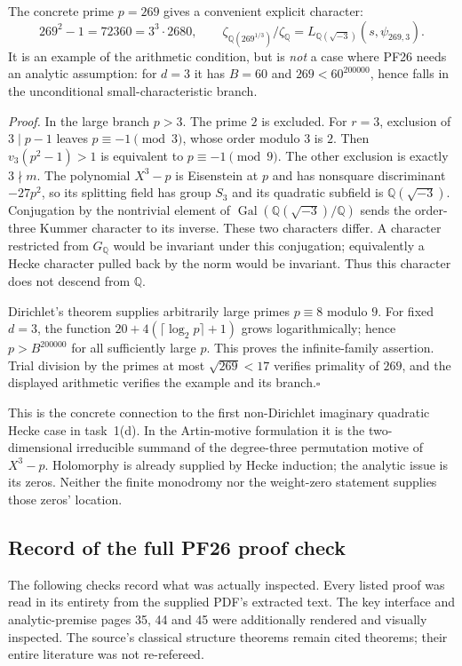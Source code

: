 The concrete prime $p=269$ gives a convenient explicit character:
\[
 269^2-1=72360=3^3\cdot2680,
 \qquad \zeta_{\mathbb Q(269^{1/3})}/\zeta_{\mathbb Q}
       =L_{\mathbb Q(\sqrt{-3})}(s,\psi_{269,3}).
 \tag{MA-PF-14}
\]
It is an example of the arithmetic condition, but is \emph{not} a
case where PF26 needs an analytic assumption: for $d=3$ it has
$B=60$ and $269<60^{200000}$, hence falls in the unconditional
small-characteristic branch.

\emph{Proof.} In the large branch $p>3$. The prime $2$ is excluded.
For $r=3$, exclusion of $3\mid p-1$ leaves $p\equiv-1\pmod3$,
whose order modulo $3$ is $2$. Then
$v_3(p^2-1)>1$ is equivalent to $p\equiv-1\pmod9$.
The other exclusion is exactly $3\nmid m$. The polynomial
$X^3-p$ is Eisenstein at $p$ and has nonsquare discriminant
$-27p^2$, so its splitting field has group $S_3$ and its quadratic
subfield is $\mathbb Q(\sqrt{-3})$. Conjugation by the nontrivial
element of $\operatorname{Gal}(\mathbb Q(\sqrt{-3})/\mathbb Q)$
sends the order-three Kummer character to its inverse. These two
characters differ. A character restricted from $G_{\mathbb Q}$
would be invariant under this conjugation; equivalently a Hecke
character pulled back by the norm would be invariant. Thus this
character does not descend from $\mathbb Q$.

Dirichlet's theorem supplies arbitrarily large primes $p\equiv8$
modulo $9$. For fixed $d=3$, the function
$20+4(\lceil\log_2p\rceil+1)$ grows logarithmically; hence
$p>B^{200000}$ for all sufficiently large $p$. This proves the
infinite-family assertion. Trial division by the primes at most
$\sqrt{269}<17$ verifies primality of $269$, and the displayed
arithmetic verifies the example and its branch.\hfill$\square$

This is the concrete connection to the first non-Dirichlet imaginary
quadratic Hecke case in task~1(d). In the Artin-motive formulation it
is the two-dimensional irreducible summand of the degree-three
permutation motive of $X^3-p$. Holomorphy is already supplied by
Hecke induction; the analytic issue is its zeros. Neither the finite
monodromy nor the weight-zero statement supplies those zeros' location.

\subsection{Record of the full PF26 proof check}

The following checks record what was actually inspected. Every listed
proof was read in its entirety from the supplied PDF's extracted
text. The key interface and analytic-premise pages 35, 44 and 45
were additionally rendered and visually inspected. The source's
classical structure theorems remain cited theorems; their entire
literature was not re-refereed.

